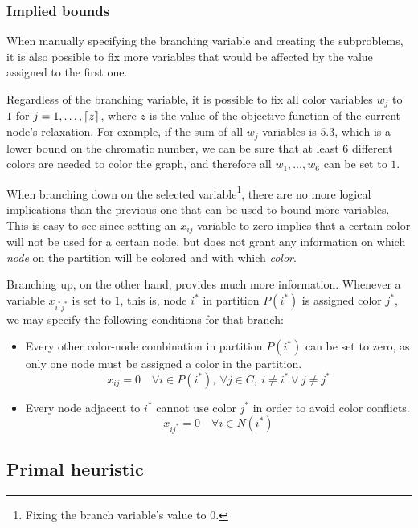 \subsubsection{Implied bounds}
\label{subsubsec:alg:branch:bounds}

When manually specifying the branching variable and creating the subproblems, it is also possible to fix more variables that would be affected by the value assigned to the first one.

Regardless of the branching variable, it is possible to fix all color variables $w_j$ to $1$ for $j = 1,\ldots,\left\lceil z \right\rceil$, where $z$ is the value of the objective function of the current node's relaxation. For example, if the sum of all $w_j$ variables is $5.3$, which is a lower bound on the chromatic number, we can be sure that at least $6$ different colors are needed to color the graph, and therefore all $w_1,\ldots,w_6$ can be set to $1$.

When branching down on the selected variable\footnote{Fixing the branch variable's value to 0.}, there are no more logical implications than the previous one that can be used to bound more variables. This is easy to see since setting an $x_{ij}$ variable to zero implies that a certain color will not be used for a certain node, but does not grant any information on which \textit{node} on the partition will be colored and with which \textit{color}.

Branching up, on the other hand, provides much more information. Whenever a variable $x_{i^*j^*}$ is set to $1$, this is, node $i^*$ in partition $P(i^*)$ is assigned color $j^*$, we may specify the following conditions for that branch:

\begin{itemize}
\item Every other color-node combination in partition $P(i^*)$ can be set to zero, as only one node must be assigned a color in the partition.
\[
x_{ij} = 0 \quad \forall i \in P(i^*),\ \forall j \in C,\ i \neq i^* \vee j \neq j^*
\]

\item Every node adjacent to $i^*$ cannot use color $j^*$ in order to avoid color conflicts.
\[
x_{ij^*} = 0 \quad \forall i \in N(i^*)
\]
\end{itemize}

\subsection{Primal heuristic}
\label{subsec:alg:primal}

